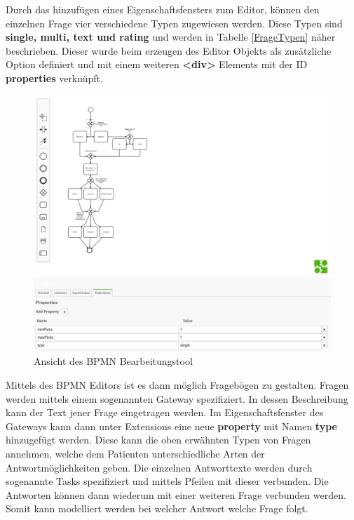 Durch das hinzufügen eines Eigenschaftsfensters zum Editor, können den einzelnen Frage vier verschiedene Typen zugewiesen werden. Diese Typen sind \textbf{single, multi, text und rating} und werden in Tabelle \ref{FrageTypen} näher beschrieben. Dieser wurde beim erzeugen des Editor Objekts als zusätzliche Option definiert und mit einem weiteren \textbf{<div>} Elements mit der ID \textbf{properties} verknüpft.

\begin{figure}[H]
	\centering
	\includegraphics[scale=0.37]{images/Screenshots/BPMNModeller}
	\caption[Ansicht des BPMN Bearbeitungstool]{Ansicht des BPMN Bearbeitungstool}
	\label{BPMNModeller}
\end{figure}

Mittels des BPMN Editors ist es dann möglich Fragebögen zu gestalten. Fragen werden mittels einem sogenannten Gateway spezifiziert. In dessen Beschreibung kann der Text jener Frage eingetragen werden. Im Eigenschaftsfenster des Gateways kann dann unter Extensions eine neue \textbf{property} mit Namen \textbf{type} hinzugefügt werden. Diese kann die oben erwähnten Typen von Fragen annehmen, welche dem Patienten unterschiedliche Arten der Antwortmöglichkeiten geben. Die einzelnen Antworttexte werden durch sogenannte Tasks spezifiziert und mittels Pfeilen mit dieser verbunden. Die Antworten können dann wiederum mit einer weiteren Frage verbunden werden. Somit kann modelliert werden bei welcher Antwort welche Frage folgt.

